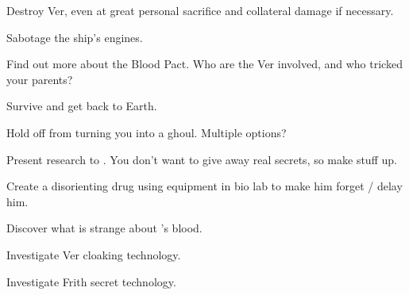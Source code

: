 \documentclass[char]{guildcamp4}
\begin{document}
\begin{itemz}[Goals]
	\item Destroy Ver, even at great personal sacrifice and collateral damage if necessary.
	\item Sabotage the ship's engines.
	\item Find out more about the Blood Pact. Who are the Ver involved, and who tricked your parents?
	\item Survive and get back to Earth.
	\item Hold off \cVone{} from turning you into a ghoul. Multiple options?
		\begin {itemz}
			\item Present research to \cVone{}. You don't want to give away real secrets, so make stuff up.
			\item Create a disorienting drug using equipment in bio lab to make him forget / delay him.
		\end {itemz}
	\item Discover what is strange about \cPlead{}'s blood.
	\item Investigate Ver cloaking technology.
	\item Investigate Frith secret technology.
\end{itemz}

\begin{itemz}[Notes]
	\item 
\end{itemz}

\begin{contacts}
	\contact{\cTest{}}
\end{contacts}
\end{document}
